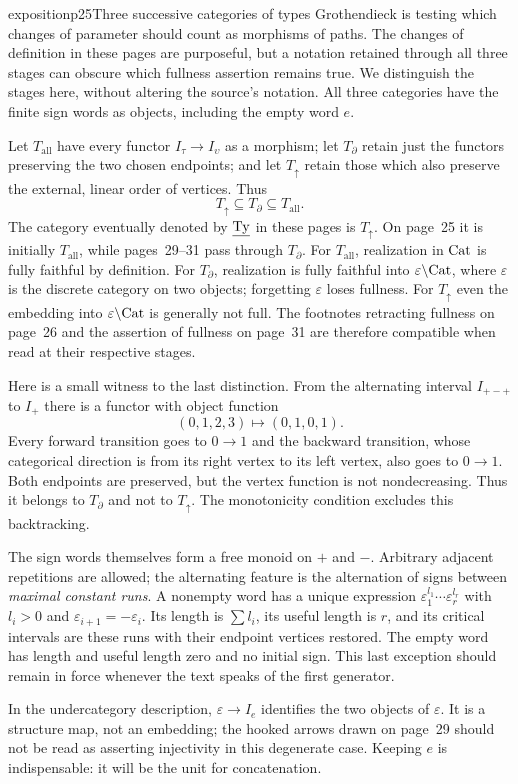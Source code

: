 \begin{dcomment}{exposition}{p25}{Three successive categories of types}
Grothendieck is testing which changes of parameter should count as morphisms of paths. The changes of definition in these pages are purposeful, but a notation retained through all three stages can obscure which fullness assertion remains true. We distinguish the stages here, without altering the source's notation. All three categories have the finite sign words as objects, including the empty word $e$.

Let $T_{\mathrm{all}}$ have every functor $I_\tau\to I_\upsilon$ as a morphism; let $T_{\partial}$ retain just the functors preserving the two chosen endpoints; and let $T_{\uparrow}$ retain those which also preserve the external, linear order of vertices. Thus
\[
 T_{\uparrow}\subseteq T_{\partial}\subseteq T_{\mathrm{all}}.
\]
The category eventually denoted by $\underline{\mathrm{Ty}}$ in these pages is $T_{\uparrow}$. On page~25 it is initially $T_{\mathrm{all}}$, while pages~29--31 pass through $T_{\partial}$. For $T_{\mathrm{all}}$, realization in $\mathrm{Cat}$ is fully faithful by definition. For $T_{\partial}$, realization is fully faithful into $\varepsilon\backslash\mathrm{Cat}$, where $\varepsilon$ is the discrete category on two objects; forgetting $\varepsilon$ loses fullness. For $T_{\uparrow}$ even the embedding into $\varepsilon\backslash\mathrm{Cat}$ is generally not full. The footnotes retracting fullness on page~26 and the assertion of fullness on page~31 are therefore compatible when read at their respective stages.

Here is a small witness to the last distinction. From the alternating interval $I_{+-+}$ to $I_+$ there is a functor with object function
\[
 (0,1,2,3)\longmapsto(0,1,0,1).
\]
Every forward transition goes to $0\to1$ and the backward transition, whose categorical direction is from its right vertex to its left vertex, also goes to $0\to1$. Both endpoints are preserved, but the vertex function is not nondecreasing. Thus it belongs to $T_{\partial}$ and not to $T_{\uparrow}$. The monotonicity condition excludes this backtracking.

The sign words themselves form a free monoid on $+$ and $-$. Arbitrary adjacent repetitions are allowed; the alternating feature is the alternation of signs between \emph{maximal constant runs}. A nonempty word has a unique expression $\varepsilon_1^{l_1}\cdots\varepsilon_r^{l_r}$ with $l_i>0$ and $\varepsilon_{i+1}=-\varepsilon_i$. Its length is $\sum l_i$, its useful length is $r$, and its critical intervals are these runs with their endpoint vertices restored. The empty word has length and useful length zero and no initial sign. This last exception should remain in force whenever the text speaks of the first generator.

In the undercategory description, $\varepsilon\to I_e$ identifies the two objects of $\varepsilon$. It is a structure map, not an embedding; the hooked arrows drawn on page~29 should not be read as asserting injectivity in this degenerate case. Keeping $e$ is indispensable: it will be the unit for concatenation.
\end{dcomment}


